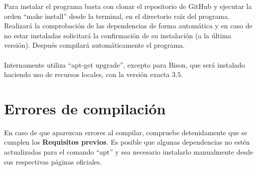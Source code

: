 Para instalar el programa basta con clonar el repositorio de GitHub y ejecutar la orden ``make install'' desde la terminal, en el directorio raíz del programa. Realizará la comprobación de las dependencias de forma automática y en caso de no estar instaladas solicitará la confirmación de su instalación (a la última versión). Después compilará automáticamente el programa.\\
\\ Internamente utiliza  ``apt-get upgrade'', excepto para Bison, que será instalado haciendo uso de recursos locales, con la versión exacta $3.5$.

\section{Errores de compilación}

En caso de que aparezcan errores al compilar, compruebe detenidamente que se cumplen los \textbf{Requisitos previos}. Es posible que algunas dependencias no estén actualizadas para el comando ``apt'' y sea necesario instalarlo manualmente desde sus respectivas páginas oficiales.

\endinput
